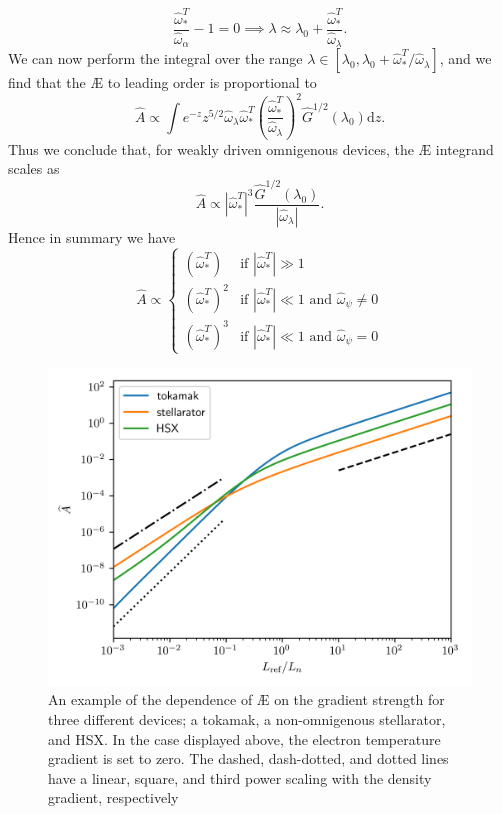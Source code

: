 \begin{equation}
    \frac{\hat{\omega}_*^T}{\hat{\omega}_\alpha} - 1 = 0 \implies \lambda \approx \lambda_0 +  \frac{\hat{\omega}_*^T}{\hat{\omega}_\lambda}.
\end{equation}
We can now perform the integral over the range $\lambda \in [\lambda_0,\lambda_0+ \hat{\omega}_*^T/\hat{\omega}_\lambda]$, and we find that the \AE{} to leading order is proportional to
\begin{equation}
    \widehat{A} \propto \int e^{-z} z^{5/2} \hat{\omega}_\lambda \hat{\omega}_*^T \left( \frac{\hat{\omega}_*^T}{\hat{\omega}_\lambda} \right)^2  \hat{G}^{1/2}(\lambda_0) \mathrm{d}z.
\end{equation}
Thus we conclude that, for weakly driven omnigenous devices, the \AE{} integrand scales as
\begin{equation}
    \widehat{A} \propto |\hat{\omega}_{*}^{T}|^3 \frac{\hat{G}^{1/2}(\lambda_0)}{|\hat{\omega}_\lambda|}.
\end{equation}
Hence in summary we have
\begin{equation}
\widehat{A} \propto
    \begin{cases}
        (\hat{\omega}_*^T) & \text{if } |\hat{\omega}_*^T| \gg 1 \\
        ( \hat{\omega}_*^T)^2 & \text{if } |\hat{\omega}_*^T| \ll 1 \text{ and } \hat{\omega}_\psi \neq 0 \\
        ( \hat{\omega}_*^T)^3 & \text{if } |\hat{\omega}_*^T| \ll 1 \text{ and } \hat{\omega}_\psi = 0
    \end{cases}
\end{equation}
\par 
\begin{figure}
    \centering
    \includegraphics{3_chapters/1_papers/AE-TE/figures/gradient-scaling.png}
    \caption{An example of the dependence of \AE{} on the gradient strength for three different devices; a tokamak, a non-omnigenous stellarator, and HSX. In the case displayed above, the electron temperature gradient is set to zero. The dashed, dash-dotted, and dotted lines have a linear, square, and third power scaling with the density gradient, respectively}
\label{fig:scaling-laws}
\end{figure}
